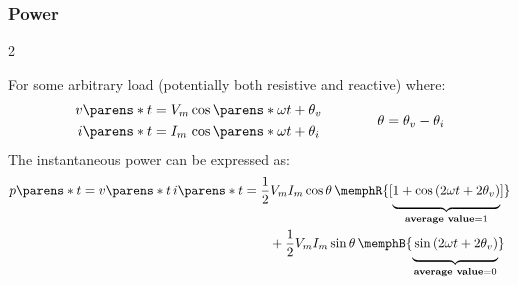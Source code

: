 \subsubsection{Power}

\begin{multicols}{2}

    \begin{CheatsheetEntryFrame}

        
        For some arbitrary load (potentially both resistive and reactive) where:
        \begin{equation*}
            \begin{alignedat}{2}
                v\parens*{t} &= V_m &&\cos\parens*{\omega t + \theta_v}
                \\
                i\parens*{t} &= I_m &&\cos\parens*{\omega t + \theta_i}
            \end{alignedat}
            \qquad\qquad
            \theta = \theta_v - \theta_i
        \end{equation*}
        The instantaneous power can be expressed as:
        \begin{align*}
            p\parens*{t}
            = v\parens*{t} \, i\parens*{t}
            &= \frac{1}{2} V_m I_m \cos\theta
            \, \memphR{[\underbrace{
                \vphantom{\frac{1}{2}}
                1 + \cos{(2 \omega t + 2 \theta_v)}
            }_{\textbf{average value} = 1}]}
            \\
            &\qquad + \frac{1}{2} V_m I_m \sin\theta
            \, \memphB{\underbrace{
                \vphantom{\frac{1}{2}}
                \sin{(2 \omega t + 2 \theta_v)}
            }_{\textbf{average value} = 0}}
        \end{align*}

    \end{CheatsheetEntryFrame}

    \begin{CheatsheetEntryFrame}


\end{CheatsheetEntryFrame}
\end{multicols}
